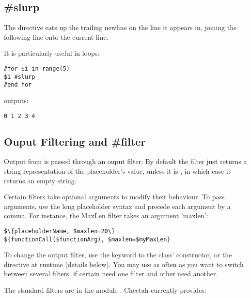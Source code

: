 \subsection{\#slurp}
\label{output.slurp}

The  directive eats up the trailing newline on the line it
appears in, joining the following line onto the current line.


It is particularly useful in  loops:
\begin{verbatim}
#for $i in range(5)
$i #slurp
#end for
\end{verbatim}
outputs:
\begin{verbatim}
0 1 2 3 4
\end{verbatim}


\subsection{Ouput Filtering and \#filter}
\label{output.filter}

Output from  is passed through an ouput filter.  By default
the filter just returns a string representation of the placeholder's value,
unless it is , in which case it returns an empty string. 

Certain filters take optional arguments to modify their behaviour.  To pass
arguments, use the long placeholder syntax and precede each argument by a comma.
For instance, the MaxLen filter takes an argument 'maxlen':

\begin{verbatim}
$\{placeholderName, $maxlen=20\}
${functionCall($functionArg), $maxlen=$myMaxLen}
\end{verbatim}

To change the output filter, use the  keyword to the
 class' constructor, or the 
directive at runtime (details below).  You may use  as often as
you want to switch between several filters, if certain 
need one filter and other  need another.

The standard filters are in the module .  Cheetah
currently provides:

